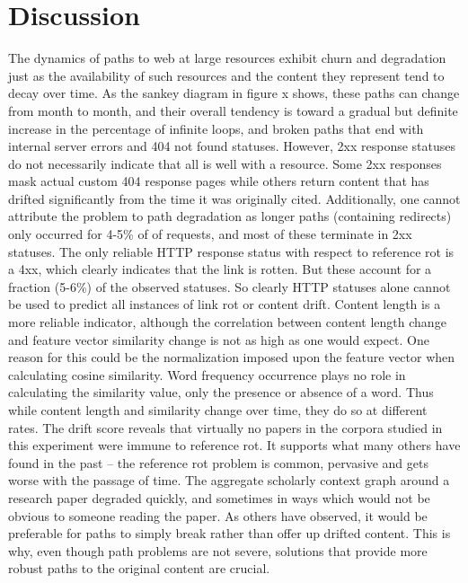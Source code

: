 \documentclass[12pt]{article}
\begin{document}
\section{Discussion}
The dynamics of paths to web at large resources exhibit churn and degradation just as the availability of such resources and the content they represent tend to decay over time. As the sankey diagram in figure x shows, these paths can change from month to month, and their overall tendency is toward a gradual but definite increase in the percentage of infinite loops, and broken paths that end with internal server errors and 404 not found statuses. However, 2xx response statuses do not necessarily indicate that all is well with a resource. Some 2xx responses mask actual custom 404 response pages while others return content that has drifted significantly from the time it was originally cited. Additionally, one cannot attribute the problem to path degradation as longer paths (containing redirects) only occurred for 4-5\% of of requests, and most of these terminate in 2xx statuses. The only reliable HTTP response status with respect to reference rot is a 4xx, which clearly indicates that the link is rotten. But these account for a fraction  (5-6\%) of the observed statuses. So clearly HTTP statuses alone cannot be used to predict all instances of link rot or content drift. Content length is a more reliable indicator, although the correlation between content length change and feature vector similarity change is not as high as one would expect. One reason for this could be the normalization imposed upon the feature vector when calculating cosine similarity. Word frequency occurrence plays no role in calculating the similarity value, only the presence or absence of a word.  Thus while content length and similarity change over time, they do so at different rates. The drift score reveals that virtually no papers in the corpora studied in this experiment were immune to reference rot. It supports what many others have found in the past – the reference rot problem is common, pervasive and gets worse with the passage of time. The aggregate scholarly context graph around a research paper degraded quickly, and sometimes in ways which would not be obvious to someone reading the paper.  As others have observed, it would be preferable for paths to simply break rather than offer up drifted content. This is why, even though path problems are not severe, solutions that provide more robust paths to the original content are crucial.
\end{document}
